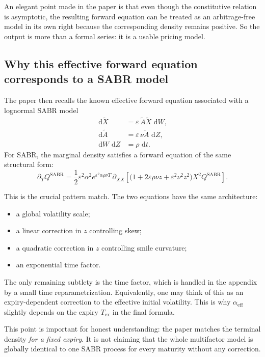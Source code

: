 \documentclass[11pt]{article}
\newcommand{\dd}{\,\mathrm{d}}
\newcommand{\eps}{\varepsilon}
\newcommand{\X}{\widetilde{X}}
\newcommand{\Vol}{\widetilde{A}}
\begin{document}
An elegant point made in the paper is that even though the constitutive relation is asymptotic, the resulting forward equation can be treated as an arbitrage-free model in its own right because the corresponding density remains positive. So the output is more than a formal series: it is a usable pricing model.

\subsection{Why this effective forward equation corresponds to a SABR model}

The paper then recalls the known effective forward equation associated with a lognormal SABR model
\begin{align*}
\dd \X &= \eps\, \Vol \X\,\dd W, \\
\dd \Vol &= \eps\, \nu \Vol\,\dd Z, \\
\dd W\,\dd Z &= \rho\,\dd t.
\end{align*}
For SABR, the marginal density satisfies a forward equation of the same structural form:
\[
\partial_T Q^{\mathrm{SABR}}
=
\frac12 \eps^2 \alpha^2 e^{\eps^2\alpha\rho\nu T}
\,
\partial_{XX}
\left[
\bigl(1+2\eps \rho\nu z+\eps^2\nu^2 z^2\bigr)
X^2Q^{\mathrm{SABR}}
\right].
\]

This is the crucial pattern match. The two equations have the same architecture:
\begin{itemize}
    \item a global volatility scale;
    \item a linear correction in \(z\) controlling skew;
    \item a quadratic correction in \(z\) controlling smile curvature;
    \item an exponential time factor.
\end{itemize}

The only remaining subtlety is the time factor, which is handled in the appendix by a small time reparametrization. Equivalently, one may think of this as an expiry-dependent correction to the effective initial volatility. This is why \(\alpha_{\mathrm{eff}}\) slightly depends on the expiry \(T_{\mathrm{ex}}\) in the final formula.

This point is important for honest understanding: the paper matches the terminal density \emph{for a fixed expiry}. It is not claiming that the whole multifactor model is globally identical to one SABR process for every maturity without any correction.
\end{document}
